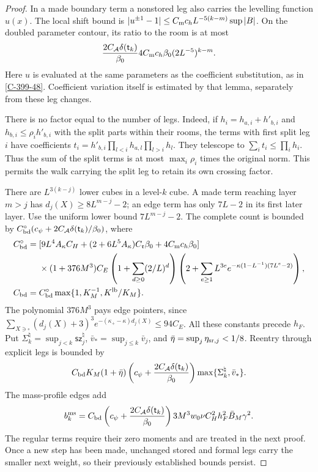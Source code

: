 \documentclass[11pt,letterpaper,reqno]{amsart}
\theoremstyle{definition}
\theoremstyle{remark}
\begin{document}
\begin{proof}
In a made boundary term a nonstored leg also carries
the levelling function $u(x)$. The local shift bound is
$|u^{\pm1}-1|\le C_{\rm m}c_h
L^{-5(k-m)}\sup|B|$. On the doubled parameter contour,
its ratio to the room is at most
\[
 \frac{2C_{\mathcal A}\delta(\mathsf t_k)}{\beta_0}
 4C_{\rm m}c_h\beta_0(2L^{-5})^{k-m}.
\]
Here $u$ is evaluated at the same parameters as the
coefficient substitution, as in \cref{C-399-48}.
Coefficient variation itself is estimated by that
lemma, separately from these leg changes.

There is no factor equal to the number of legs.
Indeed, if $h_i=h_{a,i}+h'_{b,i}$ and
$h_{b,i}\le\rho_i h'_{b,i}$ with the split parts
within their rooms, the terms with first split
leg $i$ have coefficients
$t_i=h'_{b,i}\prod_{l<i}h_{a,l}\prod_{l>i}h_l$.
They telescope to
$\sum_i t_i\le\prod_i h_i$. Thus the sum of the
split terms is at most $\max_i\rho_i$ times the
original norm. This permits the walk carrying the
split leg to retain its own crossing factor.

There are $L^{3(k-j)}$ lower cubes in a level-$k$
cube. A made term reaching layer $m>j$ has
$d_j(X)\ge8L^{m-j}-2$; an edge term has only
$7L-2$ in its first later layer. Use the uniform
lower bound $7L^{m-j}-2$. The complete count is
bounded by
$C_{\rm bd}^{\circ}
(c_\psi+2C_{\mathcal A}\delta(\mathsf t_k)/\beta_0)$,
where
\[
\begin{split}
 C_{\rm bd}^{\circ}={}&
 [9L^4A_\kappa C_H+(2+6L^5A_\kappa)C_{\mathfrak r}\beta_0
                         +4C_{\rm m}c_h\beta_0]\\
 &\times(1+376M^3)C_E
 \left(1+\sum_{d\ge0}(2/L)^d\right)
 \left(2+\sum_{e\ge1}L^{3e}
       e^{-\kappa(1-L^{-1})(7L^e-2)}\right),\\
 C_{\rm bd}={}&C_{\rm bd}^{\circ}
                    \max\{1,K_M^{-1},K^{\rm lb}/K_M\}.
\end{split}
\]
The polynomial $376M^3$ pays edge pointers, since
$\sum_{X\ni\square}(d_j(X)+3)^3
e^{-(\kappa_+-\kappa)d_j(X)}\le94C_E$.
All these constants precede $h_F$.
Put $\Sigma_k^\natural=\sup_{j<k}\mathsf{sz}_j^\natural$,
$\bar v_*=\sup_{j\le k}\bar v_j$, and
$\bar\eta=\sup_j\eta_{{\rm sr},j}<1/8$.
Reentry through explicit legs is bounded by
\begin{equation}\label{eq:qcd-boundary-contraction}
 C_{\rm bd}K_M(1+\bar\eta)
 \left(c_\psi+\frac{2C_{\mathcal A}\delta(\mathsf t_k)}{\beta_0}\right)
             \max\{\Sigma_k^\natural,\bar v_*\}.
\end{equation}
The mass-profile edges add
\[
 b_k^{\rm ms}
 =C_{\rm bd}\left(c_\psi+
       \frac{2C_{\mathcal A}\delta(\mathsf t_k)}{\beta_0}\right)
       3M^3w_0\nu C_H^2h_F^2\bar B_M\gamma^2.
\]
The regular terms require their zero moments and are
treated in the next proof. Once a new step has been
made, unchanged stored and formal legs carry the
smaller next weight, so their previously established
bounds persist.
\end{proof}
\end{document}
